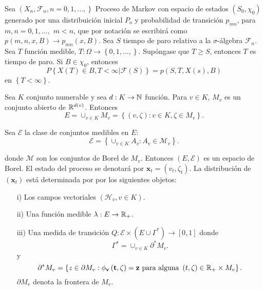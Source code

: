 \begin{Teo}
Sea $\left(X_{n},\mathcal{F}_{n},n=0,1,\ldots,\right\}$ Proceso de
Markov con espacio de estados $\left(S_{0},\chi_{0}\right)$
generado por una distribuici\'on inicial $P_{o}$ y probabilidad de
transici\'on $p_{mn}$, para $m,n=0,1,\ldots,$ $m<n$, que por
notaci\'on se escribir\'a como $p\left(m,n,x,B\right)\rightarrow
p_{mn}\left(x,B\right)$. Sea $S$ tiempo de paro relativo a la
$\sigma$-\'algebra $\mathcal{F}_{n}$. Sea $T$ funci\'on medible,
$T:\Omega\rightarrow\left\{0,1,\ldots,\right\}$. Sup\'ongase que
$T\geq S$, entonces $T$ es tiempo de paro. Si $B\in\chi_{0}$,
entonces
\begin{equation}\label{Prop.Fuerte.Markov}
P\left\{X\left(T\right)\in
B,T<\infty|\mathcal{F}\left(S\right)\right\} =
p\left(S,T,X\left(s\right),B\right)
\end{equation}
en $\left\{T<\infty\right\}$.
\end{Teo}


Sea $K$ conjunto numerable y sea $d:K\rightarrow\mathbb{N}$ funci\'on.
Para $v\in K$, $M_{v}$ es un conjunto abierto de
$\mathbb{R}^{d\left(v\right)}$. Entonces \[E=\cup_{v\in
K}M_{v}=\left\{\left(v,\zeta\right):v\in K,\zeta\in
M_{v}\right\}.\]

Sea $\mathcal{E}$ la clase de conjuntos medibles en $E$:
\[\mathcal{E}=\left\{\cup_{v\in K}A_{v}:A_{v}\in \mathcal{M}_{v}\right\}.\]

donde $\mathcal{M}$ son los conjuntos de Borel de $M_{v}$.
Entonces $\left(E,\mathcal{E}\right)$ es un espacio de Borel. El
estado del proceso se denotar\'a por
$\mathbf{x}_{t}=\left(v_{t},\zeta_{t}\right)$. La distribuci\'on
de $\left(\mathbf{x}_{t}\right)$ est\'a determinada por por los
siguientes objetos:

\begin{itemize}
\item[i)] Los campos vectoriales $\left(\mathcal{H}_{v},v\in
K\right)$. \item[ii)] Una funci\'on medible $\lambda:E\rightarrow
\mathbb{R}_{+}$. \item[iii)] Una medida de transici\'on
$Q:\mathcal{E}\times\left(E\cup\Gamma^{*}\right)\rightarrow\left[0,1\right]$
donde
\begin{equation}
\Gamma^{*}=\cup_{v\in K}\partial^{*}M_{v}.
\end{equation}
y
\begin{equation}
\partial^{*}M_{v}=\left\{z\in\partial M_{v}:\mathbf{\mathbf{\phi}_{v}\left(t,\zeta\right)=\mathbf{z}}\textrm{ para alguna }\left(t,\zeta\right)\in\mathbb{R}_{+}\times M_{v}\right\}.
\end{equation}
$\partial M_{v}$ denota  la frontera de $M_{v}$.
\end{itemize}

